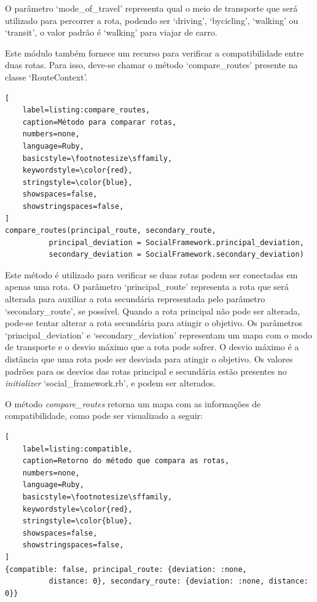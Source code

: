 O parâmetro `mode\_of\_travel'  representa qual o meio de transporte que será utilizado para percorrer a rota, podendo ser `driving', `bycicling', `walking' ou `transit', o valor padrão é `walking' para viajar de carro.

Este módulo também fornece um recurso para verificar a compatibilidade entre duas rotas. Para isso, deve-se chamar o método `compare\_routes' presente na classe `RouteContext'.

\begin{lstlisting}[
    label=listing:compare_routes,
    caption=Método para comparar rotas,
    numbers=none,
    language=Ruby,
    basicstyle=\footnotesize\sffamily,
    keywordstyle=\color{red},
    stringstyle=\color{blue},
    showspaces=false,
    showstringspaces=false,
]
compare_routes(principal_route, secondary_route,
          principal_deviation = SocialFramework.principal_deviation,
          secondary_deviation = SocialFramework.secondary_deviation)
\end{lstlisting}

Este método é utilizado para verificar se duas rotas podem ser conectadas em apenas uma rota. O parâmetro `principal\_route' representa a rota que será alterada para auxiliar a rota secundária representada pelo parâmetro `secondary\_route', se possível. Quando a rota principal não pode ser alterada, pode-se tentar alterar a rota secundária para atingir o objetivo. Os parâmetros `principal\_deviation' e `secondary\_deviation' representam um mapa com o modo de transporte e o desvio máximo que a rota pode sofrer. O desvio máximo é a distância que uma rota pode ser desviada para atingir o objetivo. Os valores padrões para os desvios das rotas principal e secundária estão presentes no \textit{initializer} `social\_framework.rb', e podem ser alterados.

O método \textit{compare\_routes} retorna um mapa com as informações de compatibilidade, como pode ser visualizado a seguir:

\begin{lstlisting}[
    label=listing:compatible,
    caption=Retorno do método que compara as rotas,
    numbers=none,
    language=Ruby,
    basicstyle=\footnotesize\sffamily,
    keywordstyle=\color{red},
    stringstyle=\color{blue},
    showspaces=false,
    showstringspaces=false,
]
{compatible: false, principal_route: {deviation: :none,
          distance: 0}, secondary_route: {deviation: :none, distance: 0}}
\end{lstlisting}

